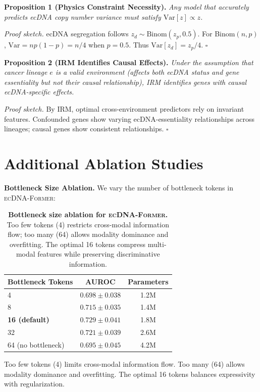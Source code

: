 \documentclass[sigconf,anonymous]{acmart}
\newcommand{\former}{\textsc{ecDNA-Former}}
\begin{document}
\textbf{Proposition 1 (Physics Constraint Necessity).} \textit{Any model that accurately predicts ecDNA copy number variance must satisfy $\text{Var}[z] \propto z$.}

\textit{Proof sketch.} ecDNA segregation follows $z_d \sim \text{Binom}(z_p, 0.5)$. For Binom$(n, p)$, $\text{Var} = np(1-p) = n/4$ when $p=0.5$. Thus $\text{Var}[z_d] = z_p/4$. $\square$

\textbf{Proposition 2 (IRM Identifies Causal Effects).} \textit{Under the assumption that cancer lineage $e$ is a valid environment (affects both ecDNA status and gene essentiality but not their causal relationship), IRM identifies genes with causal ecDNA-specific effects.}

\textit{Proof sketch.} By IRM, optimal cross-environment predictors rely on invariant features. Confounded genes show varying ecDNA-essentiality relationships across lineages; causal genes show consistent relationships. $\square$


\section{Additional Ablation Studies}
\label{app:ablations}

\textbf{Bottleneck Size Ablation.} We vary the number of bottleneck tokens in \former{}:

\begin{table}[h]
\caption{\textbf{Bottleneck size ablation for \former{}.} Too few tokens (4) restricts cross-modal information flow; too many (64) allows modality dominance and overfitting. The optimal 16 tokens compress multi-modal features while preserving discriminative information.}
\centering
\small
\begin{tabular}{@{}lcc@{}}
\toprule
Bottleneck Tokens & AUROC & Parameters \\
\midrule
4 & $0.698 \pm 0.038$ & 1.2M \\
8 & $0.715 \pm 0.035$ & 1.4M \\
\textbf{16 (default)} & $\mathbf{0.729 \pm 0.041}$ & 1.8M \\
32 & $0.721 \pm 0.039$ & 2.6M \\
64 (no bottleneck) & $0.695 \pm 0.045$ & 4.2M \\
\bottomrule
\end{tabular}
\end{table}

Too few tokens (4) limits cross-modal information flow. Too many (64) allows modality dominance and overfitting. The optimal 16 tokens balances expressivity with regularization.
\end{document}
